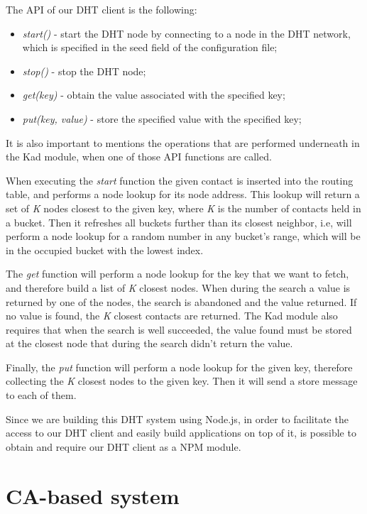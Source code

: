 The \ac{API} of our DHT client is the following:

\begin{itemize}
  \item \textit{start()} - start the DHT node by connecting to a node in the DHT network, which is specified in the seed field of the configuration file;
  \item \textit{stop()} - stop the DHT node;
  \item \textit{get(key)} - obtain the value associated with the specified key;
  \item \textit{put(key, value)} - store the specified value with the specified key;
\end{itemize}

It is also important to mentions the operations that are performed underneath in the Kad module, when one of those API functions are called.

When executing the \textit{start} function the given contact is inserted into the routing table, and performs a node lookup for its node address.
This lookup will return a set of \textit{K} nodes closest to the given key, where \textit{K} is the number of contacts held in a bucket.
Then it refreshes all buckets further than its closest neighbor, i.e, will perform a node lookup for a random number in any bucket's range, which will be in the occupied bucket with the lowest index.

The \textit{get} function will perform a node lookup for the key that we want to fetch, and therefore build a list of \textit{K} closest nodes.
When during the search a value is returned by one of the nodes, the search is abandoned and the value returned.
If no value is found,  the \textit{K} closest contacts are returned.
The Kad module also requires that when the search is well succeeded, the value found must be stored at the closest node that during the search didn't return the value.

Finally, the \textit{put} function will perform a node lookup for the given key, therefore collecting the \textit{K} closest nodes to the given key.
Then it will send a store message to each of them.

Since we are building this DHT system using Node.js, in order to facilitate the access to our DHT client and easily build applications on top of it, is possible to obtain and require our DHT client as a \ac{NPM} module.

\section{CA-based system}\label{implementation:ca-based}

